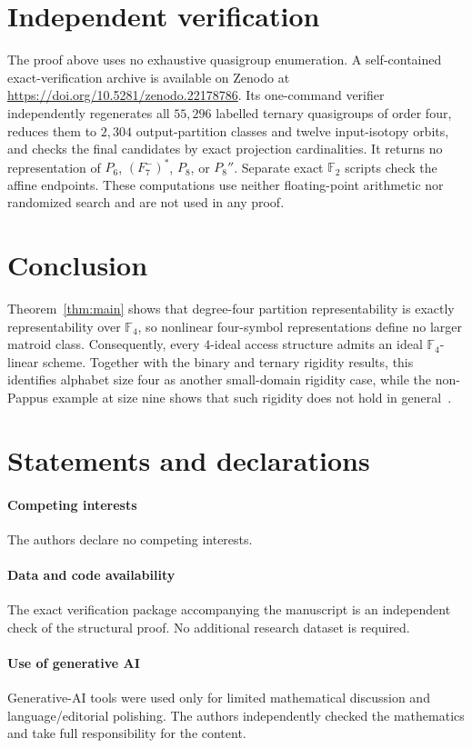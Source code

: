 \documentclass[preprint,12pt]{elsarticle}
\theoremstyle{definition}
\newcommand{\F}{\mathbb F}
\begin{document}
\section{Independent verification}\label{sec:verify}

The proof above uses no exhaustive quasigroup enumeration. A self-contained
exact-verification archive is available on Zenodo at
\url{https://doi.org/10.5281/zenodo.22178786}.
Its one-command verifier
independently regenerates all $55{,}296$ labelled ternary quasigroups of order
four, reduces them to $2{,}304$ output-partition classes and twelve
input-isotopy orbits, and checks the final candidates by exact projection
cardinalities. It returns no representation of $P_6$, $(F_7^-)^*$, $P_8$, or
$P_8''$. Separate exact $\F_2$ scripts check the affine endpoints. These
computations use neither floating-point arithmetic nor randomized search and
are not used in any proof.

\section{\texorpdfstring{Conclusion}{Conclusion}}

Theorem~\ref{thm:main} shows that degree-four partition representability is
exactly representability over $\F_4$, so nonlinear four-symbol representations
define no larger matroid class. Consequently, every $4$-ideal access structure
admits an ideal $\F_4$-linear scheme. Together with the binary and ternary
rigidity results, this identifies alphabet size four as another small-domain
rigidity case, while the non-Pappus example at size nine shows that such
rigidity does not hold in general~\cite{SimonisAshikhmin1998}.

\section*{Statements and declarations}

\paragraph{Competing interests} The authors declare no competing interests.

\paragraph{Data and code availability} The exact verification package accompanying the manuscript is an independent check of the structural proof. No additional research dataset is required.

\paragraph{Use of generative AI} Generative-AI tools were used only for limited
mathematical discussion and language/editorial polishing. The authors
independently checked the mathematics and take full responsibility for the
content.



\end{document}
